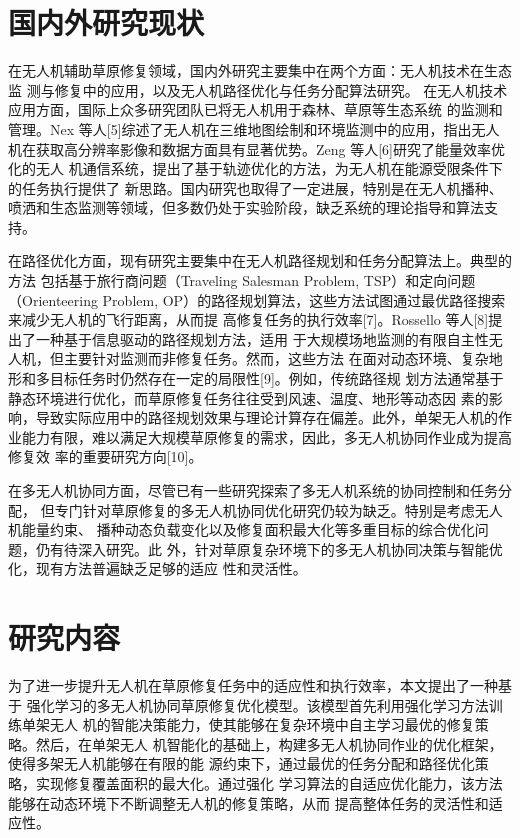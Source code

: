 \documentclass[AutoFakeBold]{LZUThesis}
\begin{document}
\section{国内外研究现状}

在无人机辅助草原修复领域，国内外研究主要集中在两个方面：无人机技术在生态监
测与修复中的应用，以及无人机路径优化与任务分配算法研究。
在无人机技术应用方面，国际上众多研究团队已将无人机用于森林、草原等生态系统
的监测和管理。Nex 等人[5]综述了无人机在三维地图绘制和环境监测中的应用，指出无人
机在获取高分辨率影像和数据方面具有显著优势。Zeng 等人[6]研究了能量效率优化的无人
机通信系统，提出了基于轨迹优化的方法，为无人机在能源受限条件下的任务执行提供了
新思路。国内研究也取得了一定进展，特别是在无人机播种、喷洒和生态监测等领域，但多数仍处于实验阶段，缺乏系统的理论指导和算法支持。

在路径优化方面，现有研究主要集中在无人机路径规划和任务分配算法上。典型的方法
包括基于旅行商问题（Traveling Salesman Problem, TSP）和定向问题（Orienteering Problem,
OP）的路径规划算法，这些方法试图通过最优路径搜索来减少无人机的飞行距离，从而提
高修复任务的执行效率[7]。Rossello 等人[8]提出了一种基于信息驱动的路径规划方法，适用
于大规模场地监测的有限自主性无人机，但主要针对监测而非修复任务。然而，这些方法
在面对动态环境、复杂地形和多目标任务时仍然存在一定的局限性[9]。例如，传统路径规
划方法通常基于静态环境进行优化，而草原修复任务往往受到风速、温度、地形等动态因
素的影响，导致实际应用中的路径规划效果与理论计算存在偏差。此外，单架无人机的作
业能力有限，难以满足大规模草原修复的需求，因此，多无人机协同作业成为提高修复效
率的重要研究方向[10]。

在多无人机协同方面，尽管已有一些研究探索了多无人机系统的协同控制和任务分配，
但专门针对草原修复的多无人机协同优化研究仍较为缺乏。特别是考虑无人机能量约束、
播种动态负载变化以及修复面积最大化等多重目标的综合优化问题，仍有待深入研究。此
外，针对草原复杂环境下的多无人机协同决策与智能优化，现有方法普遍缺乏足够的适应
性和灵活性。
\section{研究内容}
为了进一步提升无人机在草原修复任务中的适应性和执行效率，本文提出了一种基于
强化学习的多无人机协同草原修复优化模型。该模型首先利用强化学习方法训练单架无人
机的智能决策能力，使其能够在复杂环境中自主学习最优的修复策略。然后，在单架无人
机智能化的基础上，构建多无人机协同作业的优化框架，使得多架无人机能够在有限的能
源约束下，通过最优的任务分配和路径优化策略，实现修复覆盖面积的最大化。通过强化
学习算法的自适应优化能力，该方法能够在动态环境下不断调整无人机的修复策略，从而
提高整体任务的灵活性和适应性。
\end{document}
